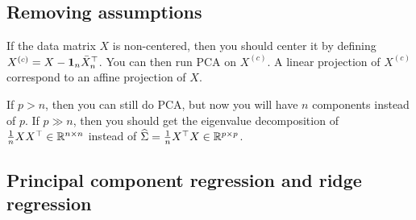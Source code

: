 \subsection{Removing assumptions}

If the data matrix $X$ is non-centered, then you should center it by defining $X^{(c)}=X- \mathbf 1_n \bar{X}_n^\top$. You can then run PCA on $X^{(c)}$. A linear projection of $X^{(c)}$ correspond to an affine projection of $X$. 

If $p > n$, then you can still do PCA, but now you will have $n$ components instead of $p$. If $p \gg n$, then you should get the eigenvalue decomposition of $\frac{1}{n}XX^\top \in \mathbb{R}^{n \times n}$ instead of $\widehat{\Sigma} = \frac{1}{n}X^\top X \in \mathbb{R}^{p \times p}$. 

\subsection{Principal component regression and ridge regression}

